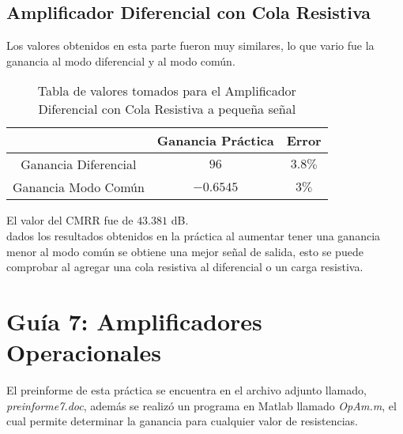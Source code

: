 \documentclass[11pt,graphicx,caption,rotating]{article}
\begin{document}
\subsection{Amplificador Diferencial con Cola Resistiva}
\noindent
Los valores obtenidos en esta parte fueron muy similares, lo que vario fue la ganancia al modo diferencial y al modo común.
\begin{table}[H]
	\centering
\begin{tabular}[c]{|c|c|c|} \hline
 & Ganancia Práctica & Error \\ \hline
Ganancia Diferencial & $96$ & $3.8\%$ \\ \hline
Ganancia Modo Común & $-0.6545$ & $3\%$ \\ \hline
\end{tabular}
	\caption{Tabla de valores tomados para el Amplificador Diferencial con Cola Resistiva a pequeña señal}
	\label{tab19}
\end{table}
\noindent
El valor del CMRR fue de $43.381$ dB.\\
dados los resultados obtenidos en la práctica al aumentar tener una ganancia menor al modo común se obtiene una mejor señal de salida, esto se puede comprobar al agregar una cola resistiva al diferencial o un carga resistiva.

\section{Guía 7: Amplificadores Operacionales}
\noindent
El preinforme de esta práctica se encuentra en el archivo adjunto llamado, \textit{preinforme7.doc}, además se realizó un programa en Matlab llamado \textit{OpAm.m}, el cual permite determinar la ganancia para cualquier valor de resistencias.
\end{document}

